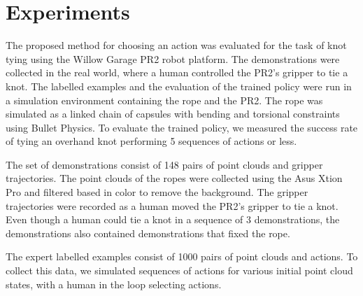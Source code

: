 \section{Experiments}
\label{sec:experiments}


The proposed method for choosing an action was evaluated for the task of knot tying using the Willow Garage PR2 robot platform. 
The demonstrations were collected in the real world, where a human controlled the PR2's gripper to tie a knot.
The labelled examples and the evaluation of the trained policy were run in a simulation environment containing the rope and the PR2.
The rope was simulated as a linked chain of capsules with bending and torsional constraints using Bullet Physics.
To evaluate the trained policy, we measured the success rate of tying an overhand knot performing 5 sequences of actions or less.

The set of demonstrations consist of 148 pairs of point clouds and gripper trajectories.
The point clouds of the ropes were collected using the Asus Xtion Pro and filtered based in color to remove the background.
The gripper trajectories were recorded as a human moved the PR2's gripper to tie a knot.
Even though a human could tie a knot in a sequence of 3 demonstrations, the demonstrations also contained demonstrations that fixed the rope.

The expert labelled examples consist of 1000 pairs of point clouds and actions.
To collect this data, we simulated sequences of actions for various initial point cloud states, with a human in the loop selecting actions.

